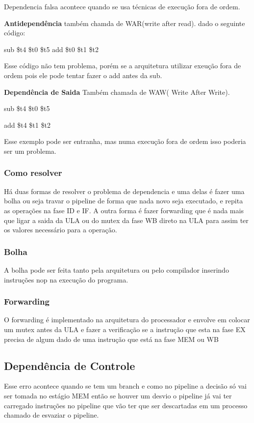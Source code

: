 \documentclass[a4paper]{article}
\begin{document}
    Dependencia falsa acontece quando se usa técnicas de execução fora de ordem.

    \textbf{Antidependência} também chamda de WAR(write after read).
    dado o seguinte código:

    sub \$t4 \$t0 \$t5
    add \$t0 \$t1 \$t2

    Esse código não tem problema, porém se a arquitetura utilizar exeução fora de ordem pois ele pode tentar fazer o add
    antes da sub.

    \textbf{Dependência de Saida}
    Também chamada de WAW( Write After Write).

    sub \$t4 \$t0 \$t5
    
    add \$t4 \$t1 \$t2

    Esse exemplo pode ser entranha, mas numa execução fora de ordem isso poderia ser um problema.

\subsubsection{Como resolver}

    Há duas formas de resolver o problema de dependencia e uma delas é fazer uma bolha ou seja travar o pipeline de forma que nada novo seja executado, e repita as operações na fase ID e IF. A outra forma é fazer forwarding que é nada mais que ligar a saida da ULA ou do mutex da fase WB direto na ULA para assim ter os valores necessário para a operação.
    
    \subsubsection{Bolha}
    
    A bolha pode ser feita tanto pela arquitetura ou pelo compilador inserindo instruções nop na execução do programa.
    
    \subsubsection{Forwarding}
    
    O forwarding é implementado na arquitetura do processador e envolve em colocar um mutex antes da ULA e fazer a verificação se a instrução que esta na fase EX precisa de algum dado de uma instrução que está na fase MEM ou WB 

\subsection{Dependência de Controle}
    Esse erro acontece quando se tem um branch e como no pipeline a decisão só vai ser tomada no estágio MEM então se
    houver um desvio o pipeline já vai ter carregado instruções no pipeline que vão ter que ser descartadas em um processo
    chamado de esvaziar o pipeline.
\end{document}
